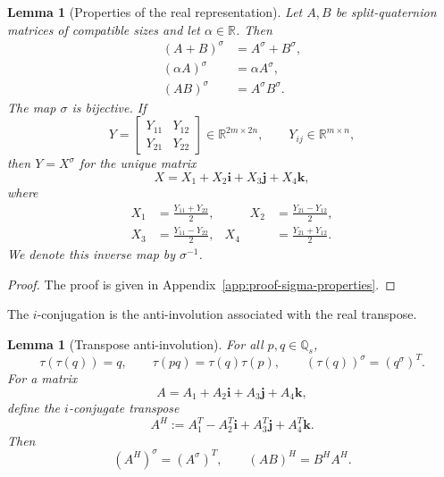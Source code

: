 \documentclass[12pt,a4paper]{article}
\theoremstyle{plain}
\newtheorem{lemma}[theorem]{Lemma}
\theoremstyle{definition}
\theoremstyle{remark}
\begin{document}
\begin{lemma}[Properties of the real representation] \label{lem:sigma_properties}
Let \(A,B\) be split-quaternion matrices of compatible sizes and let \(\alpha\in\mathbb{R}\). Then
\begin{align}
(A+B)^\sigma&=A^\sigma+B^\sigma, \label{eq:sigma_add} \\ (\alpha A)^\sigma&=\alpha A^\sigma,\label{eq:sigma_scale} 
\\ (AB)^\sigma&=A^\sigma B^\sigma. \label{thir_pro}
\end{align}
The map \(\sigma\) is bijective. If
\[
Y=
\begin{bmatrix}
Y_{11}&Y_{12}\\
Y_{21}&Y_{22}
\end{bmatrix} \in\mathbb{R}^{2m\times2n},
    \qquad Y_{ij}\in\mathbb{R}^{m\times n},
\]
then \(Y=X^\sigma\) for the unique matrix
\[
    X=X_1+X_2\mathbf{i}+X_3\mathbf{j}+X_4\mathbf{k},
\]
where
\begin{equation}\label{eq:sigma_inverse}
\begin{aligned}
    X_1&=\frac{Y_{11}+Y_{22}}{2},
    &\qquad
    X_2&=\frac{Y_{21}-Y_{12}}{2},\\
    X_3&=\frac{Y_{11}-Y_{22}}{2},
    &
    X_4&=\frac{Y_{21}+Y_{12}}{2}.
\end{aligned}
\end{equation}
We denote this inverse map by \(\sigma^{-1}\).
\end{lemma}

\begin{proof}
The proof is given in Appendix~\ref{app:proof-sigma-properties}.
\end{proof}

The \(i\)-conjugation is the anti-involution associated with the real transpose.

\begin{lemma}[Transpose anti-involution] \label{lem:tau_transpose}
For all \(p,q\in\mathbb{Q}_s\),
\[
    \tau(\tau(q))=q,
    \qquad
    \tau(pq)=\tau(q)\tau(p),
    \qquad
    (\tau(q))^\sigma=(q^\sigma)^T.
\]
For a matrix
\[
    A=A_1+A_2\mathbf{i}+A_3\mathbf{j}+A_4\mathbf{k},
\]
define the \(i\)-conjugate transpose
\begin{equation}\label{eq:H_adjoint}
    A^H :=A_1^T-A_2^T\mathbf{i}+A_3^T\mathbf{j}+A_4^T\mathbf{k}.
\end{equation}
Then
\begin{equation}\label{eq:adjoint_representation}
    (A^H)^\sigma=(A^\sigma)^T, \qquad (AB)^H=B^H A^H.
\end{equation}
\end{lemma}
\end{document}
